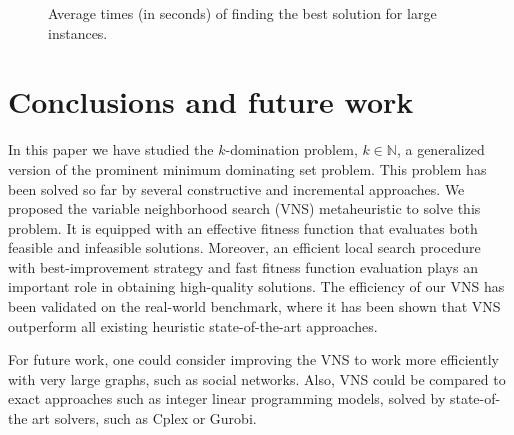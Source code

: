 \documentclass[dvipsnames,format=sigconf,anonymous=true,review=true]{acmart}
\begin{document}
\testdata


\begin{figure}
	\caption{Average times (in seconds) of finding the best solution for large instances.}
	\label{fig:timeBig}  
\end{figure}
 
\section{Conclusions and future work}

 
 In this paper we have studied the $k$-domination problem, $k \in \mathbb{N}$,  a generalized version of the prominent minimum dominating set problem. This problem has been solved so far by several constructive and incremental approaches. We proposed the variable neighborhood search (VNS) metaheuristic to solve this problem. It is equipped with an effective fitness function that evaluates both feasible and infeasible solutions. Moreover, an efficient local search procedure with best-improvement strategy and fast fitness function evaluation plays an important role in obtaining high-quality solutions. The efficiency of our VNS has been validated on the real-world benchmark, where it has been shown that VNS outperform all existing heuristic state-of-the-art approaches. 
 
 For future work, one could consider improving the VNS to work more efficiently with very large graphs, such as social networks. Also, VNS could be compared to exact approaches such as integer linear programming models, solved by state-of-the art solvers, such as Cplex or Gurobi. 
  
\end{document}
